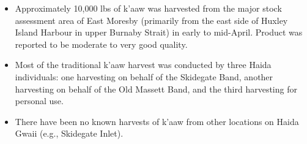 \begin{itemize}

\item Approximately 10,000 lbs of k'aaw was harvested
from the major stock assessment area of East Moresby
(primarily from the east side of Huxley Island Harbour in upper Burnaby Strait)
in early to mid-April.
Product was reported to be moderate to very good quality.

\item Most of the traditional k'aaw harvest was conducted by three Haida individuals:
one harvesting on behalf of the Skidegate Band,
another harvesting on behalf of the Old Massett Band, and
the third harvesting for personal use. 

\item There have been no known harvests of k'aaw
from other locations on Haida Gwaii (e.g., Skidegate Inlet).

\end{itemize}

